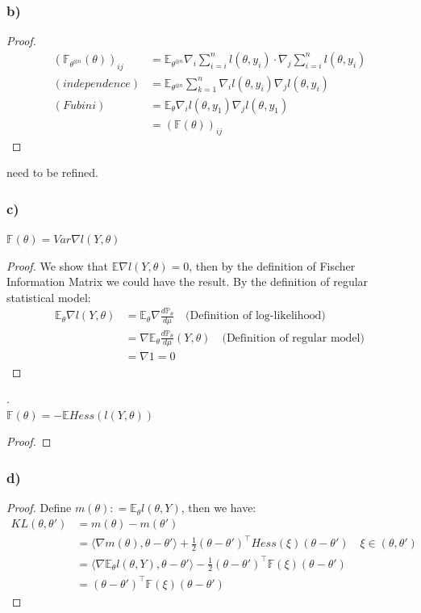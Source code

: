 \documentclass[a4paper,11pt]{article}
\theoremstyle{definition}
\theoremstyle{remark}
\begin{document}
\subsubsection*{b)}
\begin{proof}
\begin{align*}
	(\mathbb{F}_{\theta^{\otimes n}}(\theta))_{ij} &= \mathbb{E}_{\theta^{\otimes n}} \nabla_i \sum_{i = i}^n l(\theta, y_i) \cdot \nabla_j \sum_{i = i}^n l(\theta, y_i)\\
	(independence)&= \mathbb{E}_{\theta^{\otimes n}} \sum_{k = 1}^n \nabla_i l(\theta, y_i) \nabla_j l(\theta, y_i) \\
	(Fubini)&= \mathbb{E}_\theta \nabla_i l(\theta, y_1) \nabla_j l(\theta, y_1)\\
	&= (\mathbb{F}(\theta))_{ij}
\end{align*}
\end{proof}
need to be refined.


\subsubsection*{c)}
$\mathbb{F}(\theta) = Var \nabla l (Y,\theta)$
\begin{proof}
	We show that $\mathbb{E} \nabla l(Y, \theta) = 0$, then by the definition of Fischer Information Matrix we could have the result.
	By the definition of regular statistical model:
	\begin{align*}
		\mathbb{E}_\theta \nabla l(Y, \theta) &= \mathbb{E}_\theta\nabla\frac{d\mathbb{P}_\theta}{d\mu} \quad \text{(Definition of log-likelihood)}\\
		 &= \nabla \mathbb{E}_\theta \frac{d\mathbb{P}_\theta}{d\mu} (Y, \theta) \quad \text{(Definition of regular model)}\\
		 & = \nabla 1 = 0
	\end{align*}
\end{proof}
.\\
$\mathbb{F}(\theta) = -\mathbb{E} Hess(l(Y, \theta))$
\begin{proof}
\end{proof}


\subsubsection*{d)}

\begin{proof}
	Define $m(\theta): = \mathbb{E}_\theta l(\theta, Y)$, then we have:
	\begin{align*}
		KL(\theta, \theta') &= m(\theta) - m(\theta')\\
		&= \langle \nabla m(\theta), \theta - \theta' \rangle + \frac{1}{2} (\theta - \theta ')^\top Hess(\xi) (\theta - \theta') \quad \xi \in (\theta, \theta') \\
		&= \langle \nabla \mathbb{E}_\theta l(\theta, Y), \theta - \theta' \rangle - \frac{1}{2} (\theta - \theta ')^\top \mathbb{F}(\xi) (\theta - \theta')\\
		&= (\theta - \theta ')^\top \mathbb{F}(\xi) (\theta - \theta')
	\end{align*}
\end{proof}
\end{document}

